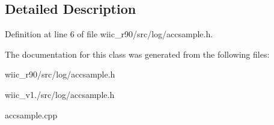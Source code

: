 \subsection{Detailed Description}


Definition at line 6 of file wiic\-\_\-r90/src/log/accsample.\-h.



The documentation for this class was generated from the following files\-:\begin{DoxyCompactItemize}
\item 
wiic\-\_\-r90/src/log/accsample.\-h\item 
wiic\-\_\-v1./src/log/accsample.\-h\item 
accsample.\-cpp\end{DoxyCompactItemize}
